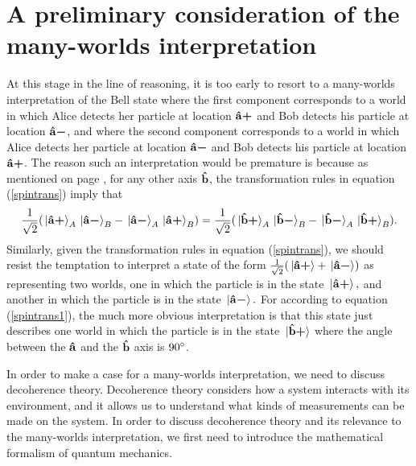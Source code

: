 \documentclass[letter, 12pt]{turabian-thesis}
\theoremstyle{hypothesis}
\newcommand{\uvb}[1]{\vb{\hat{{#1}}}}
\newcommand{\uvbp}[1]{\uvb{#1}\bm{+}}
\newcommand{\uvbm}[1]{\uvb{#1}\bm{-}}
\begin{document}
 \section{A preliminary consideration of the many-worlds interpretation}
 At this stage in the line of reasoning, it is too early to resort to a many-worlds interpretation of the Bell state where  the first component corresponds to a world in which Alice detects her particle at location $\uvbp{a}$ and Bob detects his particle at location $\uvbm{a}$, and where the second component corresponds to a world in which Alice detects her particle at location $\uvbm{a}$ and Bob detects his particle at location $\uvbp{a}$. The reason such an interpretation would be premature  is  because as mentioned on page \pageref{bellstate2}, for any other axis $\uvb{b}$, the transformation rules in equation (\ref{spintrans}) imply that
\begin{equation*}\frac{1}{\sqrt{2}}(\ket*{\uvbp{a}}_A\ket*{\uvbm{a}}_B-\ket*{\uvbm{a}}_A\ket*{\uvbp{a}}_B)=\frac{1}{\sqrt{2}}(\ket*{\uvbp{b}}_A\ket*{\uvbm{b}}_B-\ket*{\uvbm{b}}_A\ket*{\uvbp{b}}_B).\end{equation*}
Similarly, given the transformation rules in equation (\ref{spintrans}), we should resist the temptation  to interpret a state of the form $\frac{1}{\sqrt{2}}(\ket*{\uvbp{a}}+\ket*{\uvbm{a}})$ as representing two worlds, one in which the particle is in the state $\ket*{\uvbp{a}},$ and another in which the particle is in the state $\ket*{\uvbm{a}}.$ For according to equation (\ref{spintrans1}), the much more obvious interpretation is that this state just describes one world in which the particle is in the state $\ket*{\uvbp{b}}$ where the angle between
 the $\uvb{a}$ and the  $\uvb{b}$ axis is $90\degree$.\footnotemark
 
In order to make a case for a many-worlds interpretation, we need to discuss decoherence theory. Decoherence theory considers how a system interacts with its environment, and it allows us to understand what kinds of measurements can be made on the system. In order to discuss decoherence theory and its relevance to the many-worlds interpretation, we first need to introduce the mathematical formalism of quantum mechanics.
\end{document}
